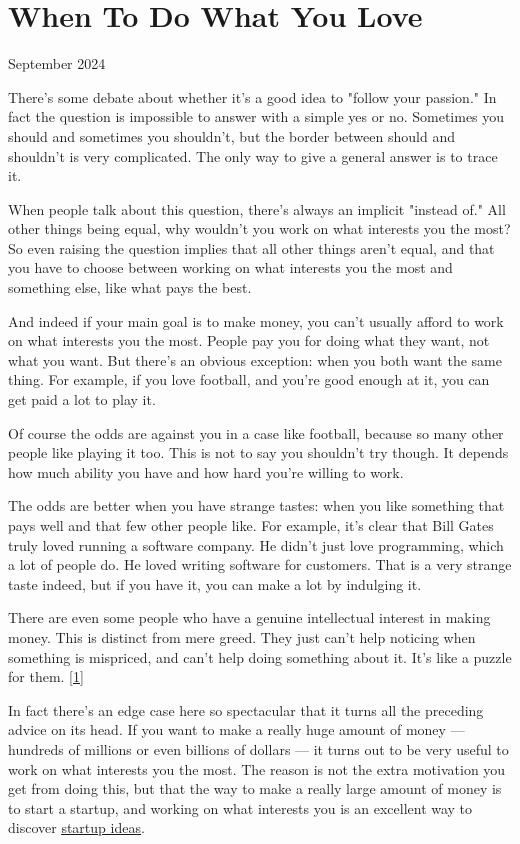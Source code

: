 \chapter{When To Do What You Love}





September 2024

There's some debate about whether it's a good idea to "follow your
passion." In fact the question is impossible to answer with a simple
yes or no. Sometimes you should and sometimes you shouldn't, but
the border between should and shouldn't is very complicated. The
only way to give a general answer is to trace it.

When people talk about this question, there's always an implicit
"instead of." All other things being equal, why wouldn't you work
on what interests you the most? So even raising the question implies
that all other things aren't equal, and that you have to choose
between working on what interests you the most and something else,
like what pays the best.

And indeed if your main goal is to make money, you can't usually
afford to work on what interests you the most. People pay you for
doing what they want, not what you want. But there's an obvious
exception: when you both want the same thing. For example, if you
love football, and you're good enough at it, you can get paid a lot
to play it.

Of course the odds are against you in a case like football, because
so many other people like playing it too. This is not to say you
shouldn't try though. It depends how much ability you have and how
hard you're willing to work.

The odds are better when you have strange tastes: when you like
something that pays well and that few other people like. For example,
it's clear that Bill Gates truly loved running a software company.
He didn't just love programming, which a lot of people do. He loved
writing software for customers. That is a very strange taste indeed,
but if you have it, you can make a lot by indulging it.

There are even some people who have a genuine intellectual interest
in making money. This is distinct from mere greed. They just can't
help noticing when something is mispriced, and can't help doing
something about it. It's like a puzzle for them.
[\href{\#f1n}{1}]

In fact there's an edge case here so spectacular that it turns all
the preceding advice on its head. If you want to make a really 
huge
amount of money --- hundreds of millions or even billions of dollars
--- it turns out to be very useful to work on what interests you the
most. The reason is not the extra motivation you get from doing
this, but that the way to make a really large amount of money is
to start a startup, and working on what interests you is an excellent
way to discover \href{http://www.paulgraham.com/startupideas.html}{\underline{startup ideas}}.

